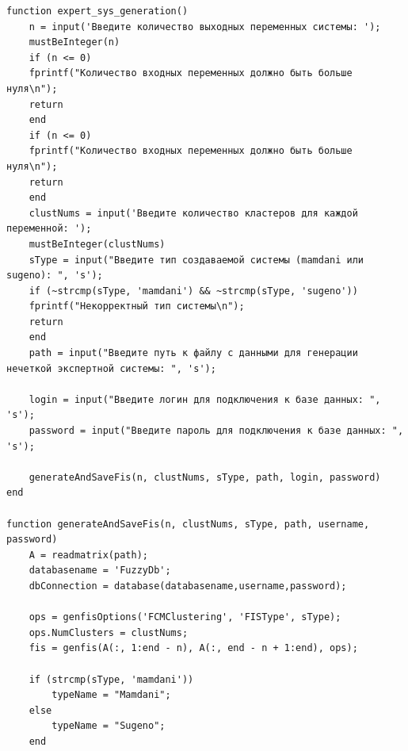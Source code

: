 \begin{lstlisting}[caption = Программа для генерации экспертных систем на основе примеров входных и выходных данных (часть 1), label = {lst:script}]
function expert_sys_generation()
	n = input('Введите количество выходных переменных системы: ');
	mustBeInteger(n)
	if (n <= 0)
	fprintf("Количество входных переменных должно быть больше нуля\n");
	return
	end
	if (n <= 0)
	fprintf("Количество входных переменных должно быть больше нуля\n");
	return
	end
	clustNums = input('Введите количество кластеров для каждой переменной: ');
	mustBeInteger(clustNums)
	sType = input("Введите тип создаваемой системы (mamdani или sugeno): ", 's');
	if (~strcmp(sType, 'mamdani') && ~strcmp(sType, 'sugeno'))
	fprintf("Некорректный тип системы\n");
	return 
	end
	path = input("Введите путь к файлу с данными для генерации нечеткой экспертной системы: ", 's');
	
	login = input("Введите логин для подключения к базе данных: ", 's');
	password = input("Введите пароль для подключения к базе данных: ", 's');

	generateAndSaveFis(n, clustNums, sType, path, login, password)
end

function generateAndSaveFis(n, clustNums, sType, path, username, password)
	A = readmatrix(path);
	databasename = 'FuzzyDb';
	dbConnection = database(databasename,username,password);
	
	ops = genfisOptions('FCMClustering', 'FISType', sType);
	ops.NumClusters = clustNums;
	fis = genfis(A(:, 1:end - n), A(:, end - n + 1:end), ops);
	
	if (strcmp(sType, 'mamdani'))
		typeName = "Mamdani";
	else
		typeName = "Sugeno";
	end
\end{lstlisting}

